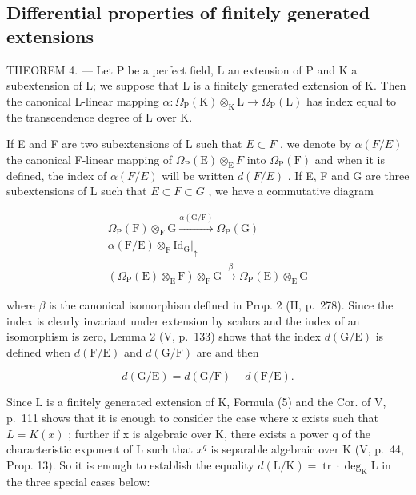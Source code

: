 \subsection{Differential properties of finitely generated extensions}

THEOREM 4. --- Let P be a perfect field, L an extension of P and K a subextension of L; we suppose that L is a finitely generated extension of K. Then the canonical L-linear mapping \(\alpha: \Omega_{\mathrm{P}}(\mathrm{K}) \otimes_{\mathrm{K}} \mathrm{L} \to \Omega_{\mathrm{P}}(\mathrm{L})\) has index equal to the transcendence degree of L over K.

If E and F are two subextensions of L such that \(E \subset F\) , we denote by \(\alpha(F/E)\) the canonical F-linear mapping of \(\Omega_{\mathrm{P}}(\mathrm{E}) \otimes_{\mathrm{E}} F\) into \(\Omega_{\mathrm{P}}(\mathrm{F})\) and when it is defined, the index of \(\alpha(F/E)\) will be written \(d(F/E)\) . If E, F and G are three subextensions of L such that \(E \subset F \subset G\) , we have a commutative diagram

\[
\begin{array}{c} \Omega_ {\mathrm{P}} (\mathrm{F}) \otimes_ {\mathrm{F}} \mathrm{G} \xrightarrow {\alpha (\mathrm{G} / \mathrm{F})} \Omega_ {\mathrm{P}} (\mathrm{G}) \\ \alpha (\mathrm{F} / \mathrm{E}) \otimes_ {\mathrm{F}} \mathrm{Id} _ {\mathrm{G}} \Bigg | _ {\uparrow} \\ (\Omega_ {\mathrm{P}} (\mathrm{E}) \otimes_ {\mathrm{E}} \mathrm{F}) \otimes_ {\mathrm{F}} \mathrm{G} \xrightarrow {\beta} \Omega_ {\mathrm{P}} (\mathrm{E}) \otimes_ {\mathrm{E}} \mathrm{G} \end{array}
\]

where \(\beta\) is the canonical isomorphism defined in Prop. 2 (II, p.~278). Since the index is clearly invariant under extension by scalars and the index of an isomorphism is zero, Lemma 2 (V, p.~133) shows that the index \(d(\mathrm{G}/\mathrm{E})\) is defined when \(d(\mathrm{F}/\mathrm{E})\) and \(d(\mathrm{G}/\mathrm{F})\) are and then

\[
d (\mathrm{G} / \mathrm{E}) = d (\mathrm{G} / \mathrm{F}) + d (\mathrm{F} / \mathrm{E}).\tag{5}
\]

Since L is a finitely generated extension of K, Formula (5) and the Cor. of V, p.~111 shows that it is enough to consider the case where x exists such that \(L = K(x)\) ; further if x is algebraic over K, there exists a power q of the characteristic exponent of L such that \(x^{q}\) is separable algebraic over K (V, p.~44, Prop. 13). So it is enough to establish the equality \(d(\mathrm{L}/\mathrm{K}) = \operatorname{tr} \cdot \deg_{\mathrm{K}} \mathrm{L}\) in the three special cases below:

